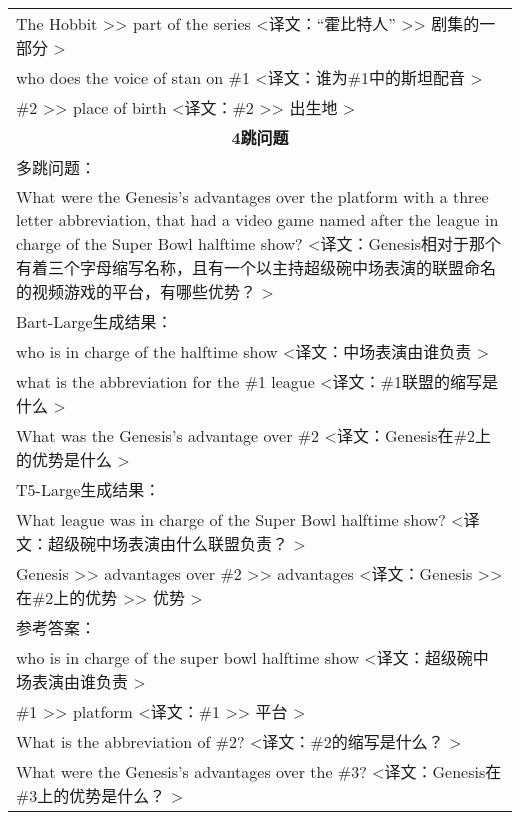 \begin{table}[htbp]
\begin{tabular}{p{408pt}}
        The Hobbit >> part of the series <译文：“霍比特人” >> 剧集的一部分 > \\
        who does the voice of stan on \#1 <译文：谁为\#1中的斯坦配音 > \\
        \#2 >> place of birth <译文：\#2 >> 出生地 > \\
        \hline
        \multicolumn{1}{c}{\bfseries 4跳问题} \\
        \hline
        多跳问题：\\
        What were the Genesis's advantages over the platform with a three letter abbreviation, that had a video game named after the league in charge of the Super Bowl halftime show? <译文：Genesis相对于那个有着三个字母缩写名称，且有一个以主持超级碗中场表演的联盟命名的视频游戏的平台，有哪些优势？ > \\
        \hline
        Bart-Large生成结果： \\
        who is in charge of the halftime show <译文：中场表演由谁负责 > \\
        what is the abbreviation for the \#1 league <译文：\#1联盟的缩写是什么 > \\
        What was the Genesis's advantage over \#2 <译文：Genesis在\#2上的优势是什么 > \\
        \hline
        T5-Large生成结果： \\
        What league was in charge of the Super Bowl halftime show? <译文：超级碗中场表演由什么联盟负责？ > \\
        Genesis >> advantages over \#2 >> advantages <译文：Genesis >> 在\#2上的优势 >> 优势 > \\
        \hline
        参考答案： \\
        who is in charge of the super bowl halftime show <译文：超级碗中场表演由谁负责 > \\
        \#1 >> platform <译文：\#1 >> 平台 > \\
        What is the abbreviation of \#2? <译文：\#2的缩写是什么？ > \\
        What were the Genesis's advantages over the \#3? <译文：Genesis在\#3上的优势是什么？ > \\
        \hline
    \end{tabular}
    \label{tab:5-8}
\end{table}
